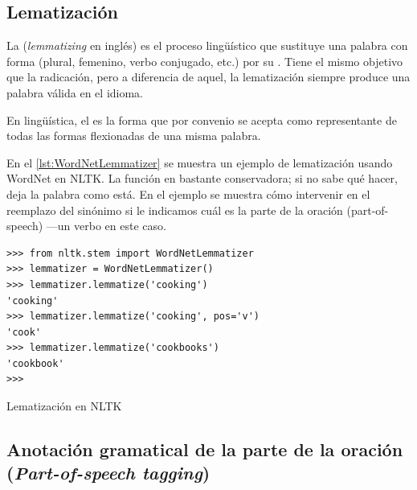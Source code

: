 \subsection{Lematización}

La  (\emph{lemmatizing} en inglés) es el proceso lingüístico que sustituye una palabra con forma  (plural, femenino, verbo conjugado, etc.) por su . Tiene el mismo objetivo que la radicación, pero a diferencia de aquel, la lematización siempre produce una palabra válida en el idioma.

\begin{definition}[Lema]
En lingüística, el  es la forma que por convenio se acepta como representante de todas las formas flexionadas de una misma palabra.
\end{definition}

En el \autoref{lst:WordNetLemmatizer} se muestra un ejemplo de lematización usando WordNet en NLTK. La función en bastante conservadora; si no sabe qué hacer, deja la palabra como está. En el ejemplo se muestra cómo intervenir en el reemplazo del sinónimo si le indicamos cuál es la parte de la oración (part-of-speech) ---un verbo en este caso.

\begin{listing}[htbp]
\begin{verbatim}
>>> from nltk.stem import WordNetLemmatizer
>>> lemmatizer = WordNetLemmatizer()
>>> lemmatizer.lemmatize('cooking')
'cooking'
>>> lemmatizer.lemmatize('cooking', pos='v')
'cook'
>>> lemmatizer.lemmatize('cookbooks')
'cookbook'
>>> 
\end{verbatim}
\caption{Lematización en NLTK}
\label{lst:WordNetLemmatizer}
\end{listing}


\subsection{Anotación gramatical de la parte de la oración (\emph{Part-of-speech tagging}) }

